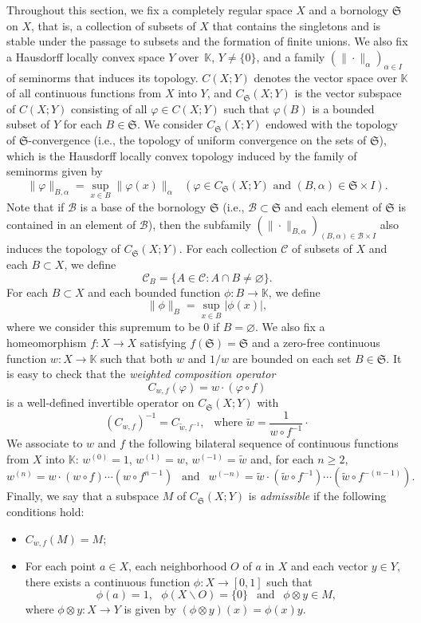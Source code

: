 \documentclass[12pt]{article}
\theoremstyle{plain}
\theoremstyle{definition}
\newcommand{\K}{\mathbb{K}} %
\newcommand{\cB}{\mathcal{B}}
\newcommand{\fS}{\mathfrak{S}}
\newcommand{\wt}{\widetilde}
\begin{document}
Throughout this section, we fix a completely regular space $X$ and a bornology $\fS$ on $X$, that is, 
a collection of subsets of $X$ that contains the singletons and is stable under the passage to subsets and the formation of finite unions.
We also fix a Hausdorff locally convex space $Y$ over~$\K$, $Y \neq \{0\}$, 
and a family $(\|\cdot\|_\alpha)_{\alpha \in I}$ of seminorms that induces its topology.
$C(X;Y)$ denotes the vector space over $\K$ of all continuous functions from $X$ into $Y$, and $C_\fS(X;Y)$ is the vector subspace 
of $C(X;Y)$ consisting of all $\varphi \in C(X;Y)$ such that $\varphi(B)$ is a bounded subset of $Y$ for each $B \in \fS$.
We consider $C_\fS(X;Y)$ endowed with the topology of $\fS$-convergence (i.e., the topology of uniform convergence on the sets of $\fS$),
which is the Hausdorff locally convex topology induced by the family of seminorms given by
\[
\|\varphi\|_{B,\alpha} = \sup_{x \in B} \|\varphi(x)\|_\alpha \ \ \ (\varphi \in C_\fS(X;Y) \text{ and } (B,\alpha) \in \fS \times I).
\]
Note that if $\cB$ is a base of the bornology $\fS$ (i.e., $\cB \subset \fS$ and each element of $\fS$ is contained in an element of $\cB$), then the subfamily $(\|\cdot\|_{B,\alpha})_{(B,\alpha) \in \cB \times I}$ also induces the topology of $C_\fS(X;Y)$.
For each collection $\mathscr{C}$ of subsets of $X$ and each $B \subset X$, we define
\[
\mathscr{C}_B = \{A \in \mathscr{C} : A \cap B \neq \varnothing\}.
\]
For each $B \subset X$ and each bounded function $\phi : B \to \K$, we define
\[
\|\phi\|_B = \sup_{x \in B} |\phi(x)|,
\]
where we consider this supremum to be $0$ if $B = \varnothing$.
We also fix a homeomorphism $f : X \to X$ satisfying $f(\fS) = \fS$ and a zero-free continuous function $w : X \to \K$ 
such that both $w$ and $1/w$ are bounded on each set $B \in \fS$.
It is easy to check that the {\em weighted composition operator}
\[
C_{w,f}(\varphi) = w \cdot (\varphi \circ f)
\]
is a well-defined invertible operator on $C_\fS(X;Y)$ with
\[
(C_{w,f})^{-1} = C_{\wt{w},f^{-1}}, \ \ \text{ where } \wt{w} = \frac{1}{w \circ f^{-1}}\cdot
\]
We associate to $w$ and $f$ the following bilateral sequence of continuous functions from $X$ into $\K$:
$w^{(0)} = 1$, $w^{(1)} = w$, $w^{(-1)} = \wt{w}$ and, for each $n \geq 2$,
\[
w^{(n)} = w \cdot (w \circ f) \cdots (w \circ f^{n-1}) \ \ \text{ and } \ \
w^{(-n)} = \wt{w} \cdot (\wt{w} \circ f^{-1}) \cdots (\wt{w} \circ f^{-(n-1)}).
\]
Finally, we say that a subspace $M$ of $C_\fS(X;Y)$ is {\em admissible} if the following conditions hold:
\begin{itemize}
\item [(C1)] $C_{w,f}(M) = M$;
\item [(C2)] For each point $a \in X$, each neighborhood $O$ of $a$ in $X$ and each vector $y \in Y$, 
  there exists a continuous function $\phi : X \to [0,1]$ such that
  \[
  \phi(a) = 1, \ \ \ \phi(X \backslash O) = \{0\} \ \ \text{ and } \ \ \phi \otimes y \in M,
  \]
  where $\phi \otimes y : X \to Y$ is given by $(\phi \otimes y)(x) = \phi(x)y$.
\end{itemize} 
\end{document}
